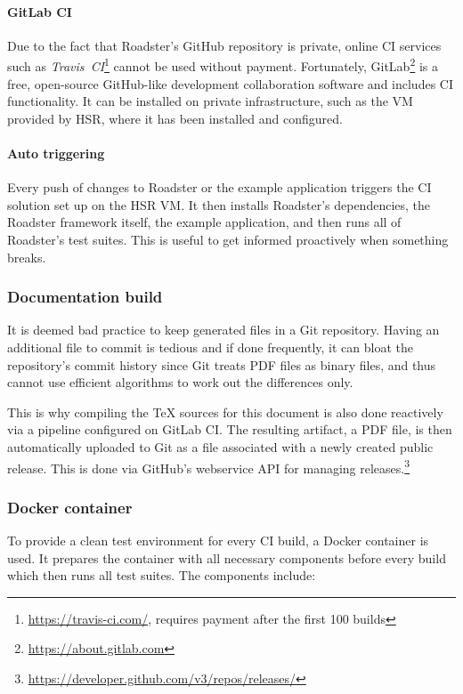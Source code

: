 \paragraph{GitLab CI} Due to the fact that Roadster's GitHub repository is private, online \gls{CI}
services such as \emph{Travis~CI}\footnote{\url{https://travis-ci.com/}, requires payment after the
first 100 builds} cannot be used without payment. Fortunately,
GitLab\footnote{\url{https://about.gitlab.com}} is a free, open-source GitHub-like development collaboration software and includes CI functionality. It can be installed on private infrastructure, such as the
\gls{VM} provided by HSR, where it has been installed and configured.

\paragraph{Auto triggering} Every push of changes to Roadster or the example application triggers the CI
solution set up on the HSR VM. It then installs Roadster's dependencies, the Roadster
framework itself, the example application, and then runs all of Roadster's test
suites. This is useful to get informed proactively when something breaks.

\subsubsection{Documentation build}
It is deemed bad practice to keep generated files in a Git
repository. Having an additional file to commit is tedious and if done
frequently, it can bloat the repository's commit history since Git treats PDF
files as binary files, and thus cannot use efficient algorithms to work out the
differences only.

This is why compiling the TeX sources for this document is also done reactively
via a pipeline configured on GitLab CI. The resulting artifact, a PDF file, is
then automatically uploaded to Git as a file associated with a newly created
public release. This is done via GitHub's webservice API for managing
releases.\footnote{\url{https://developer.github.com/v3/repos/releases/}}


\subsubsection{Docker container}
To provide a clean test environment for every CI build, a Docker container is used.
It prepares the container with all necessary components before every build
which then runs all test suites. The components include:

